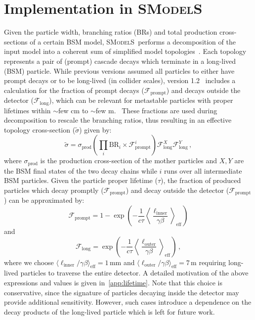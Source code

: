 \documentclass[preprint,number,sort&compress,twocolumn,3p]{elsstyarticle}
\newcommand{\smo}{\textsc{SModelS}}
\newcommand{\com}[1]{\emph{\color{red}[#1]}}  %
\begin{document}

\section{Implementation in \smo}\label{sec:impl}


Given the particle width, branching ratios (BRs) and total production cross-sections of a certain BSM model, \smo\ performs a decomposition of the input model into a coherent sum of simplified model 
topologies~\cite{Kraml:2013mwa,Ambrogi:2017neo}. 
Each topology represents a pair of (prompt) cascade decays which terminate
in a long-lived (BSM) particle. While previous versions 
assumed all particles to either have prompt decays or to be long-lived (in collider scales), version 1.2~\cite{smodlesnote} includes a calculation
for the fraction of prompt decays ($\mathcal{F}_\text{prompt}$) and decays outside the detector ($\mathcal{F}_\text{long}$), which
can be relevant for metastable particles with proper lifetimes within $\sim$few cm to $\sim$few m.~\cite{Heisig:2015yla}
These fractions are used during decomposition to 
rescale the branching ratios, thus resulting in an effective topology cross-section ($\tilde{\sigma}$) given by:
\begin{equation}
\label{eq:weights}
\tilde{\sigma} = \sigma_\text{prod}\left(\prod_i
\text{BR}_i \times \mathcal{F}_\text{prompt}^i \right)
\mathcal{F}_\text{long}^X \mathcal{F}_\text{long}^Y \,,
\end{equation}
where $\sigma_\text{prod}$ is the production cross-section of the mother particles and
$X,Y$ are the BSM final states of the two decay chains while $i$ runs over all intermediate 
BSM particles. Given the particle proper lifetime ($\tau$), the fraction of produced particles which decay promptly ($\mathcal{F}_\text{prompt}$)
and decay outside the detector ($\mathcal{F}_\text{prompt}$) can be approximated by:
\begin{equation}
\label{eq:fprompt}
\mathcal{F}_\text{prompt} = 1-\exp\left(-\frac{1}{c\tau}\left\langle\!\frac{\ell_\text{inner}}{\gamma \beta} \!\right\rangle_{\!\!\text{eff}\,}\right)
\end{equation}
and
\begin{equation}
\label{eq:Flong}
\mathcal{F}_\text{long} = \exp\left(-\frac{1}{c\tau}\left\langle\!\frac{\ell_\text{outer}}{\gamma \beta} \!\right\rangle_{\!\!\text{eff}\,}\right)\,,
\end{equation}
where we choose $\langle\ell_\text{inner}/\gamma\beta\rangle_\text{eff}=1\,$mm and $\langle\ell_\text{outer}/\gamma\beta\rangle_\text{eff}=7\,$m requiring long-lived particles to traverse the entire detector. A detailed motivation of the above expressions and values is given in~\ref{app:lifetime}. Note that this choice is conservative, since the signature of particles decaying inside the detector may provide additional sensitivity. However, such cases introduce a dependence on the decay products of the long-lived particle which is left for future work.
\end{document}

